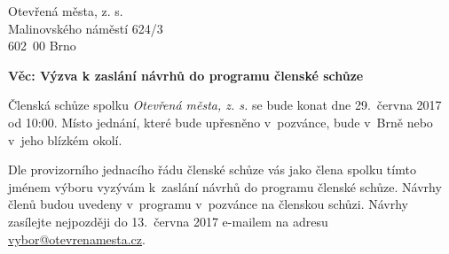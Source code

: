 \documentclass[a4paper,12pt]{letter}
\begin{document}
\pagestyle{empty}
\begin{letter}{}{}
\begin{flushleft}
Otevřená města, z. s.\\ Malinovského náměstí 624/3\\ 602\ 00 Brno
\end{flushleft}
\date{V Brně dne 29.\ května 2017}

\opening{\textbf{Věc: Výzva k zaslání návrhů do programu členské schůze}}

Členská schůze spolku \emph{Otevřená města, z. s.} se bude konat dne 29.\ června
2017 od 10:00. Místo jednání, které bude upřesněno v~pozvánce, bude v~Brně nebo
v~jeho blízkém okolí.

\sloppy
Dle provizorního jednacího řádu členské schůze vás jako člena spolku tímto
jménem výboru vyzývám k~zaslání návrhů do programu členské schůze. Návrhy členů
budou uvedeny v~programu v~pozvánce na členskou schůzi. Návrhy zasílejte
nejpozději do 13.\ června 2017 e-mailem na adresu
\href{mailto:vybor@otevrenamesta.cz}{vybor@otevrenamesta.cz}.

\fussy
\vspace{0.1\textwidth}
\begin{flushright}
\\
\\
\end{flushright}
\end{letter}
\end{document}
